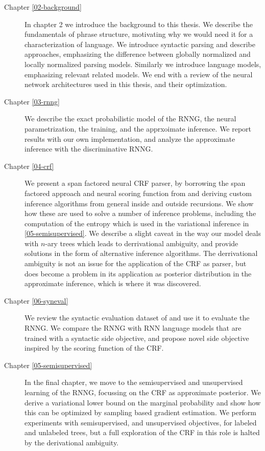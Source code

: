   \begin{description}
    \item[Chapter \ref{02-background}]
      In chapter 2 we introduce the background to this thesis. We describe the fundamentals of phrase structure, motivating why we would need it for a characterization of language. We introduce syntactic parsing and describe approaches, emphasizing the difference between globally normalized and locally normalized  parsing models. Similarly we introduce language models, emphasizing relevant related models. We end with a review of the neural network architectures used in this thesis, and their optimization.

    \item[Chapter \ref{03-rnng}]
      We describe the exact probabilistic model of the RNNG, the neural parametrization, the training, and the apprxoimate inference. We report results with our own implementation, and analyze the approximate inference with the discriminative RNNG.

    \item[Chapter \ref{04-crf}]
      We present a span factored neural CRF parser, by borrowing the span factored approach and neural scoring function from \cite{stern2017minimal} and deriving custom inference algorithms from general inside and outside recursions. We show how these are used to solve a number of inference problems, including the computation of the entropy which is used in the variational inference in \ref{05-semisupervised}. We describe a slight caveat in the way our model deals with $n$-ary trees which leads to derrivational ambiguity, and provide solutions in the form of alternative inference algorithms. The derrivational ambiguity is not an issue for the application of the CRF as parser, but does become a problem in its application as posterior distribution in the approximate inference, which is where it was discovered.

    \item[Chapter \ref{06-syneval}]
      We review the syntactic evaluation dataset of \citep{linzen2018targeted} and use it to evaluate the RNNG. We compare the RNNG with RNN language models that are trained with a syntactic side objective, and propose novel side objective inspired by the scoring function of the CRF.

    \item[Chapter \ref{05-semisupervised}]
      In the final chapter, we move to the semisupervised and unsupervised learning of the RNNG, focussing on the CRF as approximate posterior. We derive a variational lower bound on the marginal probability and show how this can be optimized by sampling based gradient estimation. We perform experiments with semisupervised, and unsupervised objectives, for labeled and unlabeled trees, but a full exploration of the CRF in this role is halted by the derivational ambiguity.

  \end{description}

